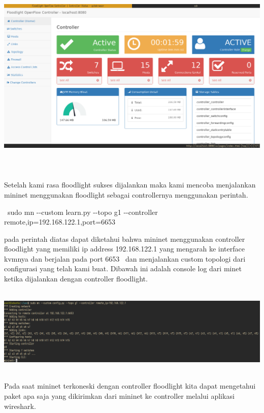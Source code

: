 \begin{center}
\includegraphics[width=6.9252in,height=3.8827in]{gambar/flhome.png}
\end{center}
Setelah kami rasa floodlight sukses dijalankan maka kami mencoba menjalankan mininet menggunakan floodlight sebagai
controllernya menggunakan perintah.

\bigskip

{\centering
\ sudo mn -{}-custom learn.py -{}-topo g1 -{}-controller remote,ip=192.168.122.1,port=6653
\par}

\bigskip

pada perintah diatas dapat diketahui bahwa mininet menggunakan controller floodlight yang memiliki ip address
192.168.122.1 yang mengarah ke interface kvmnya dan berjalan pada port 6653 \ dan menjalankan custom topologi dari
configurasi yang telah kami buat. Dibawah ini adalah console log dari minet ketika dijalankan dengan controller
floodlight.


\begin{center}
\includegraphics[width=6.9252in,height=1.6575in]{gambar/mininetlog.png}
\end{center}
Pada saat mininet terkoneski dengan controller floodlight kita dapat mengetahui paket apa saja yang dikirimkan dari
mininet ke controller melalui aplikasi wireshark. 

